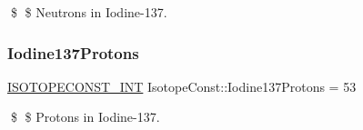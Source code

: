 \$ \$ Neutrons in Iodine-\/137. \mbox{\label{group___isotope_const-_iodine-_i137_ga7cb2dbeffda53484f898138b824beb93}} 
\subsubsection{\texorpdfstring{Iodine137\+Protons}{Iodine137Protons}}
{\footnotesize\ttfamily \mbox{\hyperlink{group___isotope_const-_macros_ga5f18360b3e99483a35c32d789e62621c}{I\+S\+O\+T\+O\+P\+E\+C\+O\+N\+S\+T\+\_\+\+I\+NT}} Isotope\+Const\+::\+Iodine137\+Protons = 53}

\$ \$ Protons in Iodine-\/137. 